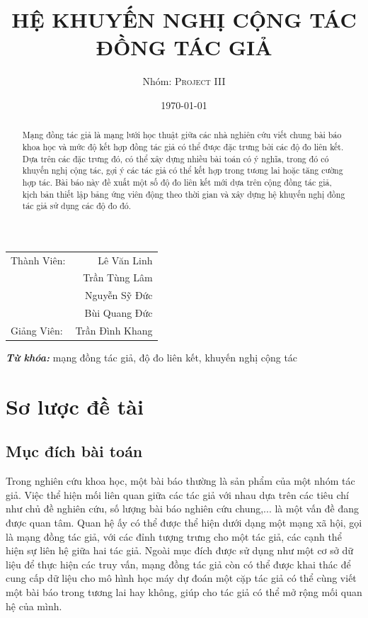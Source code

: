 \documentclass{article}
\title{HỆ KHUYẾN NGHỊ CỘNG TÁC \\ ĐỒNG TÁC GIẢ} %
\author{Nhóm: \textsc{Project III}} %
\date{\today} %
\providecommand{\keywords}[1]
{
  \small	
  \textbf{\textit{Từ khóa:}} #1
}
\begin{document}
\maketitle %

\begin{center}
\begin{tabular}{l r}
Thành Viên: & Lê Văn Linh \\ %
& Trần Tùng Lâm  \\
& Nguyễn Sỹ Đức \\
& Bùi Quang Đức \\
Giảng Viên: & Trần Đình Khang %
\end{tabular}
\end{center}

\begin{abstract}
Mạng đồng tác giả là mạng lưới học thuật giữa các nhà nghiên cứu viết chung bài
báo khoa học và mức độ kết hợp đồng tác giả có thể được đặc trưng bởi các độ đo liên kết.
Dựa trên các đặc trưng đó, có thể xây dựng nhiều bài toán có ý nghĩa, trong đó có khuyến
nghị cộng tác, gợi ý các tác giả có thể kết hợp trong tương lai hoặc tăng cường hợp tác. Bài
báo này đề xuất một số độ đo liên kết mới dựa trên cộng đồng tác giả, kịch bản thiết lập
bảng ứng viên động theo thời gian và xây dựng hệ khuyến nghị đồng tác giả sử dụng các độ
đo đó.
\end{abstract}

\hspace{10pt}
\keywords{mạng đồng tác giả, độ đo liên kết, khuyến nghị cộng tác}


\section{Sơ lược đề tài}

\subsection{Mục đích bài toán}

\indent Trong nghiên cứu khoa học, một bài báo thường là sản phẩm của một nhóm tác giả. Việc thể hiện mối liên quan giữa các tác giả với nhau dựa trên các tiêu chí như chủ đề nghiên cứu, số lượng bài báo nghiên cứu chung,... là một vấn đề đang được quan tâm. Quan hệ ấy có thể được thể hiện dưới dạng một mạng xã hội, gọi là mạng đồng tác giả, với các đỉnh tượng trưng cho một tác giả, các cạnh thể hiện sự liên hệ giữa hai tác giả. Ngoài mục đích được sử dụng như một cơ sở dữ liệu để thực hiện các truy vấn, mạng đồng tác giả còn có thể được khai thác để cung cấp dữ liệu cho mô hình học máy dự đoán một cặp tác giả có thể cùng viết một bài báo trong tương lai hay không, giúp cho tác giả có thể mở rộng mối quan hệ của mình.
\end{document}
